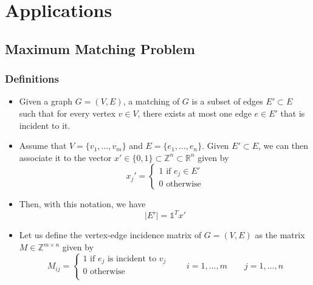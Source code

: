 \documentclass[11pt, openany]{report}
\theoremstyle{definition}
\begin{document}
\chapter{Applications}
\section{Maximum Matching Problem}
\subsection{Definitions}
\begin{itemize}
    \item Given a graph \(G=(V,E)\), a matching of \(G\) is a subset of edges \(E'\subset E\) such that for every vertex \(v\in V\), there exists at most one edge \(e\in E'\) that is incident to it.
    \item Assume that \(V=\{v_1,\dots,v_m\}\) and \(E=\{e_1,\dots, e_n\}\). Given \(E'\subset E\), we can then associate it to the vector \(x'\in \{0,1\}\subset \mathbb{Z}^n\subset \mathbb{R}^n\) given by 
    \begin{equation}
        x_j' = \begin{cases}
            1 \text{ if } e_j \in E'\\
            0\text{ otherwise}
        \end{cases}
    \end{equation}
    \item Then, with this notation, we have 
    \begin{equation}
        |E'| = \mathbb{1}^Tx'
    \end{equation}
    \item Let us define the vertex-edge incidence matrix of \(G=(V,E)\) as the matrix \(M\in \mathbb{Z}^{m\times n}\) given by
    \begin{equation}
        M_{ij} = \begin{cases} 1 \text{ if }e_j\text{ is incident to }v_j\\ 0 \text{ otherwise}\\ \end{cases} \qquad i=1,\dots,m\qquad j=1,\dots,n
    \end{equation}
\end{itemize}
\end{document}

